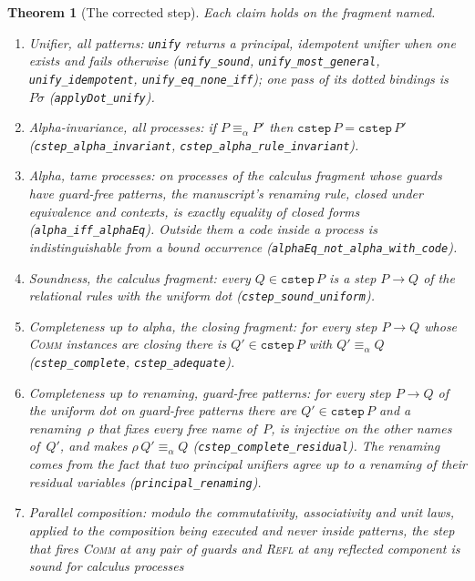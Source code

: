 \documentclass[11pt]{article}
\newtheorem{theorem}{Theorem}[section]
\theoremstyle{definition}
\theoremstyle{remark}
\begin{document}
\begin{theorem}[The corrected step]
\label{thm:metta-corrected}
Each claim holds on the fragment named.
\begin{enumerate}[nosep]
\item \emph{Unifier, all patterns:} \texttt{unify} returns a principal,
  idempotent unifier when one exists and fails otherwise
  (\texttt{unify\_sound}, \texttt{unify\_most\_general},
  \texttt{unify\_idempotent}, \texttt{unify\_eq\_none\_iff}); one pass of
  its dotted bindings is $P\dot\sigma$ (\texttt{applyDot\_unify}).
\item \emph{Alpha-invariance, all processes:} if $P \equiv_\alpha P'$ then
  $\mathtt{cstep}\,P = \mathtt{cstep}\,P'$
  (\texttt{cstep\_alpha\_invariant}, \texttt{cstep\_alpha\_rule\_invariant}).
\item \emph{Alpha, tame processes:} on processes of the calculus fragment
  whose guards have guard-free patterns, the manuscript's renaming rule,
  closed under equivalence and contexts, is exactly equality of closed forms
  (\texttt{alpha\_iff\_alphaEq}).  Outside them a code inside a process is
  indistinguishable from a bound occurrence
  (\texttt{alphaEq\_not\_alpha\_with\_code}).
\item \emph{Soundness, the calculus fragment:} every $Q \in \mathtt{cstep}\,P$
  is a step $P \longrightarrow Q$ of the relational rules with the uniform
  dot (\texttt{cstep\_sound\_uniform}).
\item \emph{Completeness up to alpha, the closing fragment:} for every step
  $P \longrightarrow Q$ whose \textsc{Comm} instances are closing there is
  $Q' \in \mathtt{cstep}\,P$ with $Q' \equiv_\alpha Q$
  (\texttt{cstep\_complete}, \texttt{cstep\_adequate}).
\item \emph{Completeness up to renaming, guard-free patterns:} for every
  step $P \longrightarrow Q$ of the uniform dot on guard-free patterns there
  are $Q' \in \mathtt{cstep}\,P$ and a renaming~$\rho$ that fixes every free
  name of~$P$, is injective on the other names of~$Q'$, and makes
  $\rho\,Q' \equiv_\alpha Q$ (\texttt{cstep\_complete\_residual}).  The
  renaming comes from the fact that two principal unifiers agree up to a
  renaming of their residual variables (\texttt{principal\_renaming}).
\item \emph{Parallel composition:} modulo the commutativity, associativity
  and unit laws, applied to the composition being executed and never inside
  patterns, the step that fires \textsc{Comm} at any pair of guards and
  \textsc{Refl} at any reflected component is sound for calculus processes

\end{enumerate}
\end{theorem}
\end{document}
